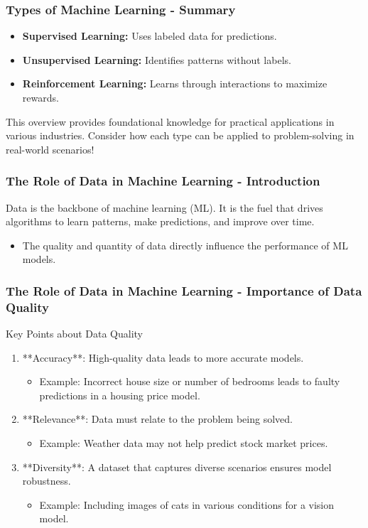 \documentclass[aspectratio=169]{beamer}
\begin{document}
\begin{frame}[fragile]
    \frametitle{Types of Machine Learning - Summary}
    \begin{itemize}
        \item \textbf{Supervised Learning:} Uses labeled data for predictions.
        \item \textbf{Unsupervised Learning:} Identifies patterns without labels.
        \item \textbf{Reinforcement Learning:} Learns through interactions to maximize rewards.
    \end{itemize}
    This overview provides foundational knowledge for practical applications in various industries. Consider how each type can be applied to problem-solving in real-world scenarios!
\end{frame}

\begin{frame}[fragile]
    \frametitle{The Role of Data in Machine Learning - Introduction}
    Data is the backbone of machine learning (ML). It is the fuel that drives algorithms to learn patterns, make predictions, and improve over time. 
    \begin{itemize}
        \item The quality and quantity of data directly influence the performance of ML models.
    \end{itemize}
\end{frame}

\begin{frame}[fragile]
    \frametitle{The Role of Data in Machine Learning - Importance of Data Quality}
    \begin{block}{Key Points about Data Quality}
        \begin{enumerate}
            \item **Accuracy**: High-quality data leads to more accurate models.
                \begin{itemize}
                    \item Example: Incorrect house size or number of bedrooms leads to faulty predictions in a housing price model.
                \end{itemize}

            \item **Relevance**: Data must relate to the problem being solved.
                \begin{itemize}
                    \item Example: Weather data may not help predict stock market prices.
                \end{itemize}

            \item **Diversity**: A dataset that captures diverse scenarios ensures model robustness.
                \begin{itemize}
                    \item Example: Including images of cats in various conditions for a vision model.
                \end{itemize}
        \end{enumerate}
    \end{block}
\end{frame}
\end{document}
